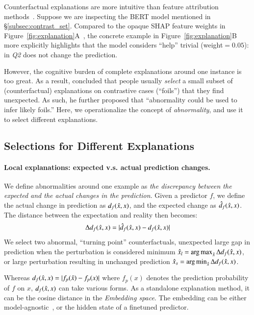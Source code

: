 Counterfactual explanations are more intuitive than feature attribution methods~\cite{miller}.
Suppose we are inspecting the \qqp BERT model mentioned in \S\ref{subsec:contrast_set}.
Compared to the opaque SHAP feature weights in Figure~\ref{fig:explanation}A~\cite{NIPS2017_7062}, the concrete example in Figure~\ref{fig:explanation}B more explicitly highlights that the model considers ``help'' trivial (weight$=0.05$): 
 in \emph{Q2} does not change the prediction.

However, the cognitive burden of complete explanations around one instance is too great.
As a result, \citet{miller} concluded that people usually \emph{select} a small subset of (counterfactual) explanations on contrastive cases (``foils'') that they find unexpected. 
As such, he further proposed that ``abnormality could be used to infer likely foils.''
Here, we operationalize the concept of \emph{abnormality}, and use it to select different explanations.


\subsection{Selections for Different Explanations}

\paragraph{Local explanations: expected v.s. actual prediction changes.}

We define abnormalities around one example as \emph{the discrepancy between the expected and the actual changes in the prediction}.
Given a predictor $f$, we define the actual change in prediction as $d_f(\hat{x}, x)$, and the expected change as $\hat{d}_f(\hat{x}, x)$.
The distance between the expectation and reality then becomes:
$$\Delta d_f(\hat{x}, x) = |\hat{d}_f(\hat{x}, x)-d_f(\hat{x}, x)|$$
We select two abnormal, ``turning point'' counterfactuals, \ie unexpected large gap in prediction when the perturbation is considered minimum $\hat{x}_l = \operatorname*{arg\,max}_{\hat{x}} \Delta d_f(\hat{x}, x)$, or large perturbation resulting in unchanged prediction $\hat{x}_s = \operatorname*{arg\,min}_{\hat{x}} \Delta d_f(\hat{x}, x)$.

Whereas $d_f(\hat{x}, x)=|f_p(\hat{x})-f_p(x)|$ where $f_p(x)$ denotes the prediction probability of $f$ on $x$, $d_f(\hat{x}, x)$ can take various forms. 
As a standalone explanation method, it can be the cosine distance in the \emph{Embedding space}.
The embedding can be either model-agnostic~\cite{reimers-2019-sentence-bert}, or the hidden state of a finetuned predictor.


